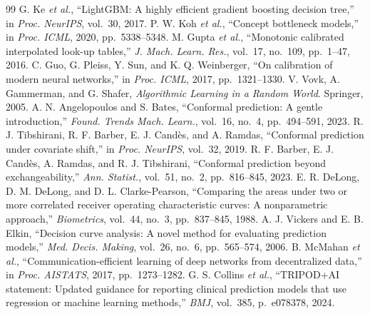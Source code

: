 \documentclass[journal]{IEEEtran}
\begin{document}
\begin{thebibliography}{99}
 G. Ke \emph{et al.}, ``LightGBM: A highly efficient gradient boosting decision tree,'' in \emph{Proc. NeurIPS}, vol.~30, 2017.
 P. W. Koh \emph{et al.}, ``Concept bottleneck models,'' in \emph{Proc. ICML}, 2020, pp.~5338--5348.
 M. Gupta \emph{et al.}, ``Monotonic calibrated interpolated look-up tables,'' \emph{J. Mach. Learn. Res.}, vol.~17, no.~109, pp.~1--47, 2016.
 C. Guo, G. Pleiss, Y. Sun, and K. Q. Weinberger, ``On calibration of modern neural networks,'' in \emph{Proc. ICML}, 2017, pp.~1321--1330.
 V. Vovk, A. Gammerman, and G. Shafer, \emph{Algorithmic Learning in a Random World}. Springer, 2005.
 A. N. Angelopoulos and S. Bates, ``Conformal prediction: A gentle introduction,'' \emph{Found. Trends Mach. Learn.}, vol.~16, no.~4, pp.~494--591, 2023.
 R. J. Tibshirani, R. F. Barber, E. J. Cand{\`e}s, and A. Ramdas, ``Conformal prediction under covariate shift,'' in \emph{Proc. NeurIPS}, vol.~32, 2019.
 R. F. Barber, E. J. Cand{\`e}s, A. Ramdas, and R. J. Tibshirani, ``Conformal prediction beyond exchangeability,'' \emph{Ann. Statist.}, vol.~51, no.~2, pp.~816--845, 2023.
 E. R. DeLong, D. M. DeLong, and D. L. Clarke-Pearson, ``Comparing the areas under two or more correlated receiver operating characteristic curves: A nonparametric approach,'' \emph{Biometrics}, vol.~44, no.~3, pp.~837--845, 1988.
 A. J. Vickers and E. B. Elkin, ``Decision curve analysis: A novel method for evaluating prediction models,'' \emph{Med. Decis. Making}, vol.~26, no.~6, pp.~565--574, 2006.
 B. McMahan \emph{et al.}, ``Communication-efficient learning of deep networks from decentralized data,'' in \emph{Proc. AISTATS}, 2017, pp.~1273--1282.
 G. S. Collins \emph{et al.}, ``TRIPOD+AI statement: Updated guidance for reporting clinical prediction models that use regression or machine learning methods,'' \emph{BMJ}, vol.~385, p.~e078378, 2024.
\end{thebibliography}
\end{document}
